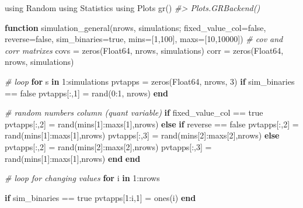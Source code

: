 \documentclass[]{article}
\newenvironment{Shaded}{\begin{snugshade}}{\end{snugshade}}
\newcommand{\CommentTok}[1]{\textcolor[rgb]{0.56,0.35,0.01}{\textit{#1}}}
\newcommand{\DataTypeTok}[1]{\textcolor[rgb]{0.13,0.29,0.53}{#1}}
\newcommand{\FloatTok}[1]{\textcolor[rgb]{0.00,0.00,0.81}{#1}}
\newcommand{\KeywordTok}[1]{\textcolor[rgb]{0.13,0.29,0.53}{\textbf{#1}}}
\newcommand{\NormalTok}[1]{#1}
\begin{document}
\begin{Shaded}
\begin{Highlighting}[]
\NormalTok{using Random}
\NormalTok{using Statistics}
\NormalTok{using Plots}
\NormalTok{gr()}
\CommentTok{#> Plots.GRBackend()}

\KeywordTok{function}\NormalTok{ simulation_general(nrows, simulations; fixed_value_col=false, reverse=false, sim_binaries=true, mins=[}\FloatTok{1}\NormalTok{,}\FloatTok{100}\NormalTok{], maxs=[}\FloatTok{10}\NormalTok{,}\FloatTok{10000}\NormalTok{]) }
    \CommentTok{# cov and corr matrixes}
\NormalTok{    covs = zeros(}\DataTypeTok{Float64}\NormalTok{, nrows, simulations)}
\NormalTok{    corr = zeros(}\DataTypeTok{Float64}\NormalTok{, nrows, simulations)}

    \CommentTok{# loop}
    \KeywordTok{for}\NormalTok{ s }\KeywordTok{in} \FloatTok{1}\NormalTok{:simulations}
\NormalTok{        pvtapps = zeros(}\DataTypeTok{Float64}\NormalTok{, nrows, }\FloatTok{3}\NormalTok{)}
        \KeywordTok{if}\NormalTok{ sim_binaries == false}
\NormalTok{            pvtapps[:,}\FloatTok{1}\NormalTok{] = rand(}\FloatTok{0}\NormalTok{:}\FloatTok{1}\NormalTok{, nrows)}
        \KeywordTok{end}

        \CommentTok{# random numbers column (quant variable)}
        \KeywordTok{if}\NormalTok{ fixed_value_col == true}
\NormalTok{            pvtapps[:,}\FloatTok{2}\NormalTok{] = rand(mins[}\FloatTok{1}\NormalTok{]:maxs[}\FloatTok{1}\NormalTok{],nrows)}
        \KeywordTok{else}
            \KeywordTok{if}\NormalTok{ reverse == false}
\NormalTok{                pvtapps[:,}\FloatTok{2}\NormalTok{] = rand(mins[}\FloatTok{1}\NormalTok{]:maxs[}\FloatTok{1}\NormalTok{],nrows)}
\NormalTok{                pvtapps[:,}\FloatTok{3}\NormalTok{] = rand(mins[}\FloatTok{2}\NormalTok{]:maxs[}\FloatTok{2}\NormalTok{],nrows)}
            \KeywordTok{else} 
\NormalTok{                pvtapps[:,}\FloatTok{2}\NormalTok{] = rand(mins[}\FloatTok{2}\NormalTok{]:maxs[}\FloatTok{2}\NormalTok{],nrows)}
\NormalTok{                pvtapps[:,}\FloatTok{3}\NormalTok{] = rand(mins[}\FloatTok{1}\NormalTok{]:maxs[}\FloatTok{1}\NormalTok{],nrows)}
            \KeywordTok{end}
        \KeywordTok{end}

        \CommentTok{# loop for changing values}
        \KeywordTok{for}\NormalTok{ i }\KeywordTok{in} \FloatTok{1}\NormalTok{:nrows}

            \KeywordTok{if}\NormalTok{ sim_binaries == true}
\NormalTok{                pvtapps[}\FloatTok{1}\NormalTok{:i,}\FloatTok{1}\NormalTok{] = ones(i)}
            \KeywordTok{end}


\end{Highlighting}
\end{Shaded}
\end{document}
